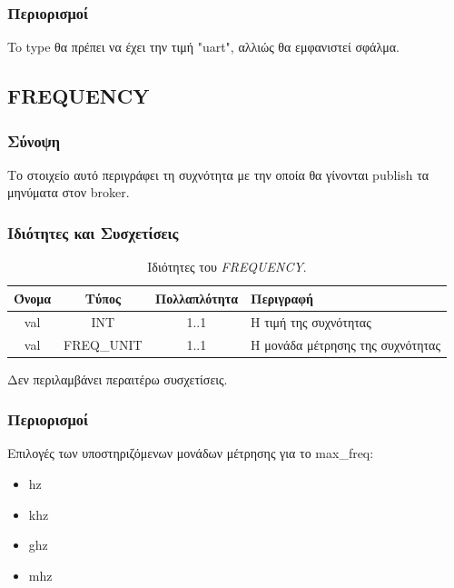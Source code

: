 \subsubsection*{Περιορισμοί}

\noindent To type θα πρέπει να έχει την τιμή "uart", αλλιώς θα εμφανιστεί σφάλμα.

\subsection{FREQUENCY}
\label{subsec:frequency}

\subsubsection*{Σύνοψη}

\noindent Το στοιχείο αυτό περιγράφει τη συχνότητα με την οποία θα γίνονται publish τα μηνύματα στον broker.

\subsubsection*{Ιδιότητες και Συσχετίσεις}

\begin{table}[H]
	\begin{center}
		\caption{Ιδιότητες του \textit{FREQUENCY}.}
		\label{tab:frequency}
		\begin{tabular}{ | c | c | c| m{5.5cm} | }
			\hline
			\rowcolor{Gray}
			Όνομα & Τύπος & Πολλαπλότητα & Περιγραφή \\
			\hline
			val & INT & 1..1 & Η τιμή της συχνότητας \\
			\hline
			val & FREQ\_UNIT & 1..1 & Η μονάδα μέτρησης της συχνότητας \\
			\hline
		\end{tabular}
	\end{center}
\end{table}

\noindent Δεν περιλαμβάνει περαιτέρω συσχετίσεις.

\subsubsection*{Περιορισμοί}

\noindent Επιλογές των υποστηριζόμενων μονάδων μέτρησης για το max\_freq:

\begin{itemize}
	\item hz
	\item khz
	\item ghz
	\item mhz
\end{itemize}